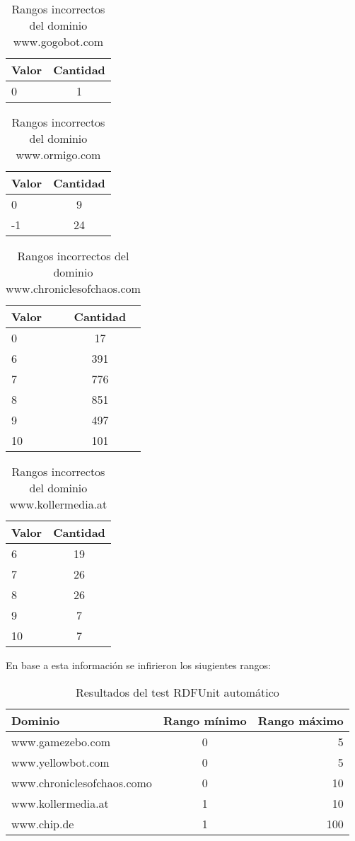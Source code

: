 \begin{table}[h]
\begin{tabular}{| l | c |}\hline
 Valor & Cantidad\\\hline
 0 & 1\\\hline
\end{tabular}
\caption{Rangos incorrectos del dominio www.gogobot.com}
\label{table:Gogobot}
\end{table}

\begin{table}[h]
\begin{tabular}{| l | c |}\hline
 Valor & Cantidad\\\hline
 0 & 9\\
 -1 & 24\\\hline
\end{tabular}
\caption{Rangos incorrectos del dominio www.ormigo.com}
\label{table:Ormigo}
\end{table}

\begin{table}[h]
\begin{tabular}{| l | c |}\hline
 Valor & Cantidad\\\hline
 0 & 17\\
 6 & 391\\
 7 & 776\\
 8 & 851\\
 9 & 497\\
 10 & 101\\\hline
\end{tabular}
\caption{Rangos incorrectos del dominio www.chroniclesofchaos.com}
\label{table:Chronic}
\end{table}

\begin{table}[h]
\begin{tabular}{| l | c |}\hline
 Valor & Cantidad\\\hline
 6 & 19\\
 7 & 26\\
 8 & 26\\
 9 & 7\\
 10 & 7\\\hline
\end{tabular}
\caption{Rangos incorrectos del dominio www.kollermedia.at}
\label{table:Kollermedia}
\end{table}
 
En base a esta información se infirieron los siugientes rangos:

\begin{table}[h]
\begin{tabular}{| l | c | r | }\hline
 Dominio & Rango mínimo & Rango máximo \\\hline
 www.gamezebo.com & 0 & 5 \\
 www.yellowbot.com & 0 & 5 \\
 www.chroniclesofchaos.como & 0 & 10 \\
 www.kollermedia.at & 1 & 10 \\
 www.chip.de & 1 & 100 \\\hline
\end{tabular}
\caption{Resultados del test RDFUnit automático}
\label{table:RDFUnitAutomatic}
\end{table}

